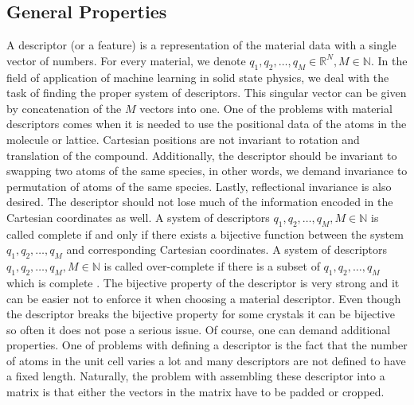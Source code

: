 \documentclass[11pt,oneside,czech,american]{book} %
\theoremstyle{plain}
\theoremstyle{definition}
\begin{document}
\subsection{General Properties} \label{gen}
A descriptor (or a feature) is a representation of the material data with a single vector of numbers. For every material, we denote $q_1, q_2, \dots, q_M \in \mathbb{R}^N, M \in \mathbb{N}$. In the field of application of machine learning in solid state physics, we deal with the task of finding the proper system of descriptors. This singular vector can be given by concatenation of the $M$ vectors into one. %
One of the problems with material descriptors comes when it is needed to use the positional data of the atoms in the molecule or lattice. Cartesian positions are not invariant to rotation and translation of the compound. Additionally, the descriptor should be invariant to swapping two atoms of the same species, in other words, we demand invariance to permutation of atoms of the same species. Lastly, reflectional invariance is also desired. The descriptor should not lose much of the information encoded in the Cartesian coordinates as well. A system of descriptors ${q_1, q_2, \dots, q_M}, M \in \mathbb{N}$ is called complete if and only if there exists a bijective function between the system ${q_1, q_2, \dots, q_M}$ and corresponding Cartesian coordinates. A system of descriptors ${q_1, q_2, \dots, q_M}, M \in \mathbb{N}$ is called over-complete if there is a subset of ${q_1, q_2, \dots, q_M}$ which is complete \parencite{bartok13}. The bijective property of the descriptor is very strong and it can be easier not to enforce it when choosing a material descriptor. Even though the descriptor breaks the bijective property for some crystals it can be bijective so often it does not pose a serious issue. Of course, one can demand additional properties. One of problems with defining a descriptor is the fact that the number of atoms in the unit cell varies a lot and many descriptors are not defined to have a fixed length. Naturally, the problem with assembling these descriptor into a matrix is that either the vectors in the matrix have to be padded or cropped.
\end{document}
